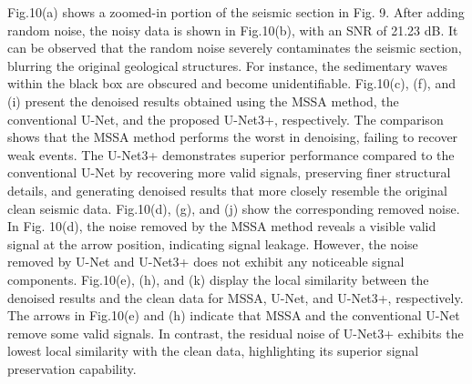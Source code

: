 \documentclass[preprint,12pt]{elsarticle}
\begin{document}
Fig.10(a) shows a zoomed-in portion of the seismic section in Fig. 9. After adding random noise, the noisy data is shown in Fig.10(b), with an SNR of 21.23 dB. It can be observed that the random noise severely contaminates the seismic section, blurring the original geological structures. For instance, the sedimentary waves within the black box are obscured and become unidentifiable. Fig.10(c), (f), and (i) present the denoised results obtained using the MSSA method, the conventional U-Net, and the proposed U-Net3+, respectively. The comparison shows that the MSSA method performs the worst in denoising, failing to recover weak events. The U-Net3+ demonstrates superior performance compared to the conventional U-Net by recovering more valid signals, preserving finer structural details, and generating denoised results that more closely resemble the original clean seismic data. Fig.10(d), (g), and (j) show the corresponding removed noise. In Fig. 10(d), the noise removed by the MSSA method reveals a visible valid signal at the arrow position, indicating signal leakage. However, the noise removed by U-Net and U-Net3+ does not exhibit any noticeable signal components. Fig.10(e), (h), and (k) display the local similarity between the denoised results and the clean data for MSSA, U-Net, and U-Net3+, respectively. The arrows in Fig.10(e) and (h) indicate that MSSA and the conventional U-Net remove some valid signals. In contrast, the residual noise of U-Net3+ exhibits the lowest local similarity with the clean data, highlighting its superior signal preservation capability.
\end{document}
